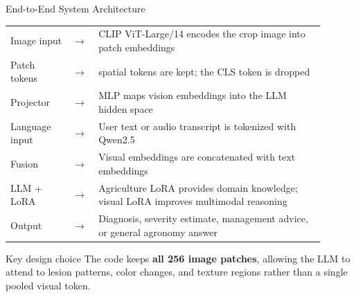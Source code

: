 \documentclass[aspectratio=169,11pt]{beamer}
\begin{document}
\begin{frame}{End-to-End System Architecture}
\small
\begin{center}
\begin{tabular}{>{\RaggedRight\arraybackslash}p{0.18\linewidth} >{\centering\arraybackslash}p{0.06\linewidth} >{\RaggedRight\arraybackslash}p{0.66\linewidth}}
Image input & $\rightarrow$ & CLIP ViT-Large/14 encodes the crop image into patch embeddings \\
Patch tokens & $\rightarrow$ & 256 spatial tokens are kept; the CLS token is dropped \\
Projector & $\rightarrow$ & MLP maps vision embeddings into the LLM hidden space \\
Language input & $\rightarrow$ & User text or audio transcript is tokenized with Qwen2.5 \\
Fusion & $\rightarrow$ & Visual embeddings are concatenated with text embeddings \\
LLM + LoRA & $\rightarrow$ & Agriculture LoRA provides domain knowledge; visual LoRA improves multimodal reasoning \\
Output & $\rightarrow$ & Diagnosis, severity estimate, management advice, or general agronomy answer
\end{tabular}
\end{center}
\vspace{0.4em}
\begin{block}{Key design choice}
The code keeps \textbf{all 256 image patches}, allowing the LLM to attend to lesion patterns, color changes, and texture regions rather than a single pooled visual token.
\end{block}
\end{frame}
\end{document}
